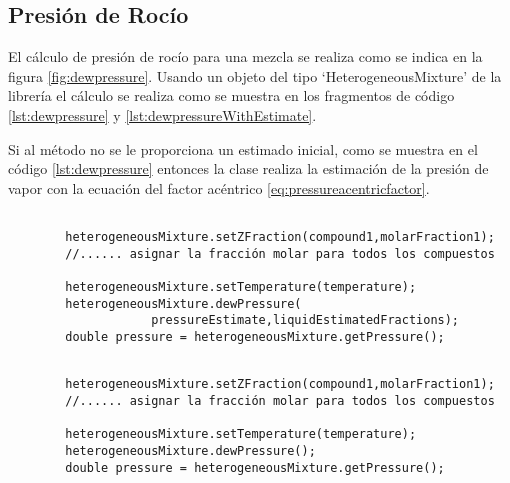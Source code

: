 \subsection{Presión de Rocío}\label{subsec:dewpressure}

	El cálculo de presión de rocío para una mezcla se realiza como se indica en la figura \ref{fig:dewpressure}. Usando un objeto del tipo `HeterogeneousMixture' de la librería \Materia el cálculo se realiza como se muestra en los fragmentos de código \ref{lst:dewpressure} y \ref{lst:dewpressureWithEstimate}.

	Si al método no se le proporciona un estimado inicial, como se muestra en el código \ref{lst:dewpressure} entonces la clase realiza la estimación de la presión de vapor con la ecuación del factor acéntrico \ref{eq:pressureacentricfactor}. 

	\begin{lstlisting}[label={lst:dewpressureWithEstimate},caption={Cálculo de la presión de rocío proporcionando un estimado inicial.}]

		heterogeneousMixture.setZFraction(compound1,molarFraction1);
		//...... asignar la fracción molar para todos los compuestos

		heterogeneousMixture.setTemperature(temperature);
		heterogeneousMixture.dewPressure(
					pressureEstimate,liquidEstimatedFractions);
		double pressure = heterogeneousMixture.getPressure();
	\end{lstlisting}

	\begin{lstlisting}[label={lst:dewpressure},caption={Cálculo de la presión de rocío.}]

		heterogeneousMixture.setZFraction(compound1,molarFraction1);
		//...... asignar la fracción molar para todos los compuestos

		heterogeneousMixture.setTemperature(temperature);
		heterogeneousMixture.dewPressure();
		double pressure = heterogeneousMixture.getPressure();
	\end{lstlisting}
